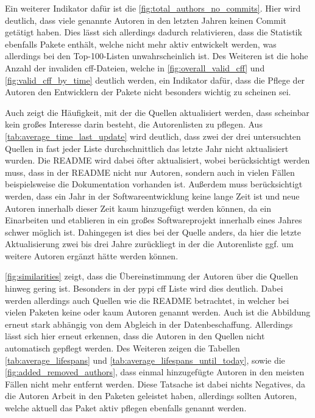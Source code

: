 Ein weiterer Indikator dafür ist die \autoref{fig:total_authors_no_commits}.
Hier wird deutlich, dass viele genannte Autoren in den letzten Jahren keinen Commit getätigt haben.
Dies lässt sich allerdings dadurch relativieren, dass die Statistik ebenfalls Pakete enthält, welche nicht mehr aktiv entwickelt werden, was allerdings bei den Top-100-Listen unwahrscheinlich ist.
Des Weiteren ist die hohe Anzahl der invaliden \gls{cff}-Dateien, welche in \autoref{fig:overall_valid_cff} und \autoref{fig:valid_cff_by_time} deutlich werden, ein Indikator dafür, dass die Pflege der Autoren den Entwicklern der Pakete nicht besonders wichtig zu scheinen sei.

Auch zeigt die Häufigkeit, mit der die Quellen aktualisiert werden, dass scheinbar kein großes Interesse darin besteht, die Autorenlisten zu pflegen.
Aus \autoref{tab:average_time_last_update} wird deutlich, dass zwei der drei untersuchten Quellen in fast jeder Liste durchschnittlich das letzte Jahr nicht aktualisiert wurden.
Die README wird dabei öfter aktualisiert, wobei berücksichtigt werden muss, dass in der README nicht nur Autoren, sondern auch in vielen Fällen beispielsweise die Dokumentation vorhanden ist.
Außerdem muss berücksichtigt werden, dass ein Jahr in der Softwareentwicklung keine lange Zeit ist und neue Autoren innerhalb dieser Zeit kaum hinzugefügt werden können, da ein Einarbeiten und etablieren in ein großes Softwareprojekt innerhalb eines Jahres schwer möglich ist.
Dahingegen ist dies bei der  Quelle anders, da hier die letzte Aktualisierung zwei bis drei Jahre zurückliegt in der die Autorenliste ggf. um weitere Autoren ergänzt hätte werden können.

\autoref{fig:similarities} zeigt, dass die Übereinstimmung der Autoren über die Quellen hinweg gering ist.
Besonders in der \gls{pypi} \gls{cff} Liste wird dies deutlich.
Dabei werden allerdings auch Quellen wie die README betrachtet, in welcher bei vielen Paketen keine oder kaum Autoren genannt werden.
Auch ist die Abbildung erneut stark abhängig von dem Abgleich in der Datenbeschaffung.
Allerdings lässt sich hier erneut erkennen, dass die Autoren in den Quellen nicht automatisch gepflegt werden.
Des Weiteren zeigen die Tabellen \ref{tab:average_lifespans} und \ref{tab:average_lifespans_until_today}, sowie die \autoref{fig:added_removed_authors}, dass einmal hinzugefügte Autoren in den meisten Fällen nicht mehr entfernt werden.
Diese Tatsache ist dabei nichts Negatives, da die Autoren Arbeit in den Paketen geleistet haben, allerdings sollten Autoren, welche aktuell das Paket aktiv pflegen ebenfalls genannt werden.

